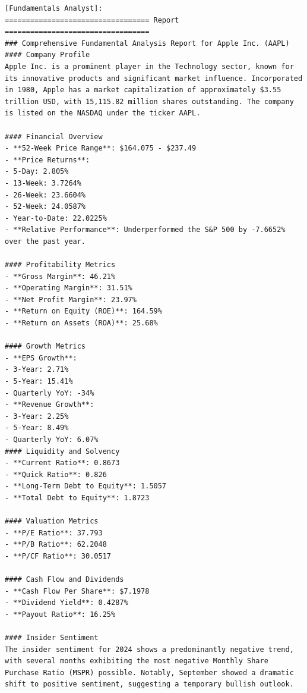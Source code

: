 
\begin{tcolorbox}[
    breakable,
    enhanced,
    colback=lightgreen!60!white,
    colframe=green!25!gray,
    coltitle=black,
    boxrule=0.5pt,
    arc=0.5mm,
    top=2mm, bottom=2mm, left=2mm, right=2mm,
    fonttitle=\usefont{T1}{ppl}{b}{n},
    title=\model: Fundamentals Analyst Team -- Apple (AAPL),
]
\footnotesize
\begin{lstlisting}[style=agentbase]
[Fundamentals Analyst]:
================================== Report ==================================
### Comprehensive Fundamental Analysis Report for Apple Inc. (AAPL)
#### Company Profile
Apple Inc. is a prominent player in the Technology sector, known for its innovative products and significant market influence. Incorporated in 1980, Apple has a market capitalization of approximately $3.55 trillion USD, with 15,115.82 million shares outstanding. The company is listed on the NASDAQ under the ticker AAPL.

#### Financial Overview
- **52-Week Price Range**: $164.075 - $237.49
- **Price Returns**:
- 5-Day: 2.805%
- 13-Week: 3.7264%
- 26-Week: 23.6604%
- 52-Week: 24.0587%
- Year-to-Date: 22.0225%
- **Relative Performance**: Underperformed the S&P 500 by -7.6652% over the past year.

#### Profitability Metrics
- **Gross Margin**: 46.21%
- **Operating Margin**: 31.51%
- **Net Profit Margin**: 23.97%
- **Return on Equity (ROE)**: 164.59%
- **Return on Assets (ROA)**: 25.68%

#### Growth Metrics
- **EPS Growth**:
- 3-Year: 2.71%
- 5-Year: 15.41%
- Quarterly YoY: -34%
- **Revenue Growth**:
- 3-Year: 2.25%
- 5-Year: 8.49%
- Quarterly YoY: 6.07%
#### Liquidity and Solvency
- **Current Ratio**: 0.8673
- **Quick Ratio**: 0.826
- **Long-Term Debt to Equity**: 1.5057
- **Total Debt to Equity**: 1.8723

#### Valuation Metrics
- **P/E Ratio**: 37.793
- **P/B Ratio**: 62.2048
- **P/CF Ratio**: 30.0517

#### Cash Flow and Dividends
- **Cash Flow Per Share**: $7.1978
- **Dividend Yield**: 0.4287%
- **Payout Ratio**: 16.25%

#### Insider Sentiment
The insider sentiment for 2024 shows a predominantly negative trend, with several months exhibiting the most negative Monthly Share Purchase Ratio (MSPR) possible. Notably, September showed a dramatic shift to positive sentiment, suggesting a temporary bullish outlook.


\end{lstlisting}
\end{tcolorbox}
